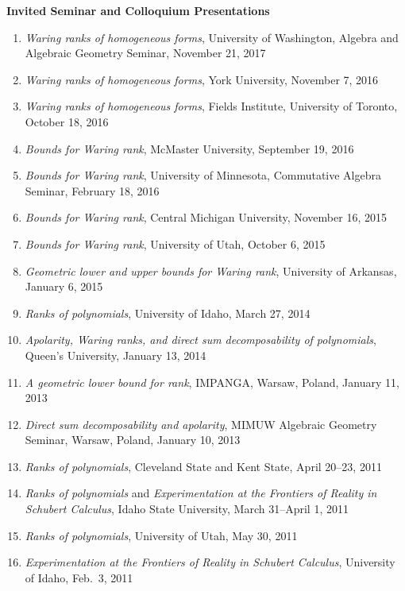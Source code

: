 \documentclass[12pt]{article}
\begin{document}
\textbf{Invited Seminar and Colloquium Presentations}
\begin{enumerate}
\item \textit{Waring ranks of homogeneous forms}, University of Washington, Algebra and Algebraic Geometry Seminar, November 21, 2017
\item \textit{Waring ranks of homogeneous forms}, York University, November 7, 2016
\item \textit{Waring ranks of homogeneous forms}, Fields Institute, University of Toronto, October 18, 2016
\item \textit{Bounds for Waring rank}, McMaster University, September 19, 2016
\item \textit{Bounds for Waring rank}, University of Minnesota, Commutative Algebra Seminar, February 18, 2016
\item \textit{Bounds for Waring rank}, Central Michigan University, November 16, 2015
\item \textit{Bounds for Waring rank}, University of Utah, October 6, 2015
\item \textit{Geometric lower and upper bounds for Waring rank}, University of Arkansas, January 6, 2015
\item \textit{Ranks of polynomials}, University of Idaho, March 27, 2014
\item \textit{Apolarity, Waring ranks, and direct sum decomposability of polynomials}, Queen's University, January 13, 2014
\item \textit{A geometric lower bound for rank}, IMPANGA, Warsaw, Poland, January 11, 2013
\item \textit{Direct sum decomposability and apolarity}, MIMUW Algebraic Geometry Seminar, Warsaw, Poland, January 10, 2013
\item \textit{Ranks of polynomials}, Cleveland State and Kent State, April 20--23, 2011
\item \textit{Ranks of polynomials} and \textit{Experimentation at the Frontiers of Reality in Schubert Calculus}, Idaho State University, March 31--April 1, 2011
\item \textit{Ranks of polynomials}, University of Utah, May 30, 2011
\item \textit{Experimentation at the Frontiers of Reality in Schubert Calculus}, University of Idaho, Feb.\ 3, 2011


\end{enumerate}
\end{document}

